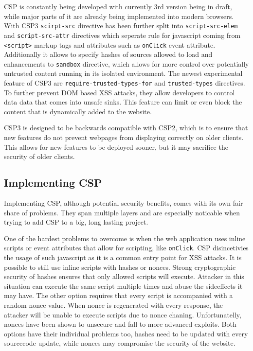 \documentclass[11]{article}   %
\begin{document}
CSP is constantly being developed with currently 3rd version being in draft, while major parts of it are already being implemented into modern browsers.
With CSP3 \texttt{scirpt-src} directive has been further split into \texttt{script-src-elem} and \texttt{script-src-attr} directives which seperate rule for javascript coming from \texttt{<script>} markup tags and attributes such as \texttt{onClick} event attribute.
Additionally it allows to specify hashes of sources allowed to load and enhancements to \texttt{sandbox} directive, which allows for more control over potentially untrusted content running in its isolated environment.
The newest experimental feature of CSP3 are \texttt{require-trusted-types-for} and \texttt{trusted-types} directives.
To further prevent DOM based XSS attacks, they allow developers to control data data that comes into unsafe sinks.
This feature can limit or even block the content that is dynamically added to the website.

CSP3 is designed to be backwards compatible with CSP2, which is to ensure that new features do not prevent webpages from displaying correctly on older clients.
This allows for new features to be deployed sooner, but it may sacrifice the security of older clients.


\subsection{Implementing CSP}
Implementing CSP, although potential security benefits, comes with its own fair share of problems. 
They span multiple layers and are especially noticable when trying to add CSP to a big, long lasting project.

One of the hardest problems to overcome is when the web application uses inline scripts or event attributes that allow for scripting, like \texttt{onClick}.
CSP disincetivies the usage of such javascript as it is a common entry point for XSS attacks. 
It is possible to still use inline scripts with hashes or nonces. 
Strong cryptographic security of hashes ensures that only allowed scripts will execute. 
Attacker in this situation can execute the same script multiple times and abuse the sideeffects it may have.
The other option requires that every script is accompanied with a random nonce value.
When nonce is regenerated with every response, the attacker will be unable to execute scripts due to nonce chaning.
Unfortunatelly, nonces have been shown to unsecure and fall to more advanced exploits. \cite{??}
Both options have their individual problems too, hashes need to be updated with every sourcecode update, while nonces may compromise the security of the website.
\end{document}
